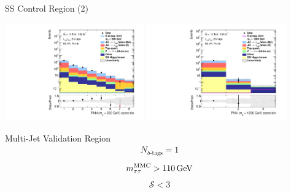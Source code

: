 \documentclass[11pt, xcolor={dvipsnames}, aspectratio=169]{beamer}
\begin{document}

\begin{frame}{SS Control Region (2)}
  \centering

  \includegraphics[width=0.45\textwidth]{vrplots/ssvr/Region_BMin0_incJet1_distPNN500_J2_Y2015_DLLSS_T2_SpcTauHH_L0_Prefitlog}%
  \hfill%
  \includegraphics[width=0.45\textwidth]{vrplots/ssvr/Region_BMin0_incJet1_distPNN1000_J2_Y2015_DLLSS_T2_SpcTauHH_L0_Prefitlog}
\end{frame}


\begin{frame}{Multi-Jet Validation Region}
  \begin{align*}
    N_{b\text{-tags}} = 1
  \end{align*}
  \begin{align*}
    \mMMC > \SI{110}{\GeV}
  \end{align*}
  \begin{align*}
    \mathcal{S} < 3
  \end{align*}
\end{frame}

\end{document}
